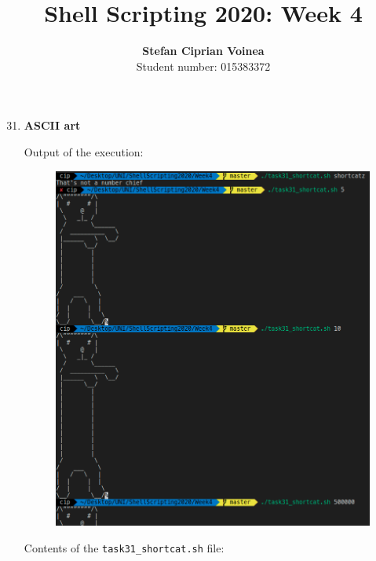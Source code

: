 \documentclass[9pt]{article}
\begin{document}
\title{Shell Scripting 2020: Week 4}
\author{\textbf{Stefan Ciprian Voinea}\\Student number: 015383372}
\maketitle


\begin{enumerate}
	
	\setcounter{enumi}{30}
	
	\item \textbf{ASCII art}
	
		Output of the execution:
		\begin{figure}[h!]
			\centering
			\includegraphics[width=14cm]{img/31.png}
		\end{figure}
	
		\newpage
		Contents of the \texttt{task31\_shortcat.sh} file:


\end{enumerate}
\end{document}
